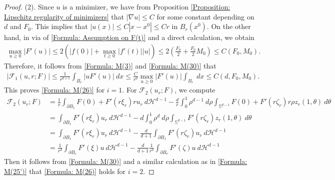 \documentclass[11pt,reqno]{amsart}
\begin{document}
\begin{proof}
    (2). Since $u$ is a minimizer, we have from Proposition \ref{Proposition: Lipschitz regularity of minimizers} that $|\nabla u|\leqslant C$ for some constant depending on $d$ and $F_{0}$. This implies that $|u(x)|\leqslant C|x-x^{0}|\leqslant Cr$ in $B_{r}(x^{0})$. On the other hand, in via of \eqref{Formula: Assumption on F(t)} and a direct calculation, we obtain
    \begin{align}\label{Formula: M(30)}
    	\max_{u\geqslant0}|F'(u)|\leqslant2(|f(0)|+\max_{t\geqslant0}|f'(t)||u|)\leqslant2\left(\frac{F_{0}}{2}+\frac{F_{0}}{2}M_{0}\right)\leqslant C(F_{0},M_{0}).
    \end{align}
    Therefore, it follows from \eqref{Formula: M(3)} and \eqref{Formula: M(30)} that
    \begin{align}\label{Formula: M(25')}
    	|\mathcal{F}_{1}(u,r;F)|\leqslant\frac{1}{r^{d+1}}\int_{B_{r}}|uF'(u)|\:dx\leqslant\frac{C}{r^{d}}\max_{u\geqslant0}|F'(u)|\int_{B_{r}}\:dx\leqslant C(d,F_{0},M_{0}).
    \end{align}
    This proves \eqref{Formula: M(26)} for $i=1$. For $\mathcal{F}_{2}(u_{r};F)$, we compute
    \begin{align*}
    	\mathcal{F}_{2}(u_{r};F)&=\frac{1}{r}\int_{\partial B_{1}}F(0)+F'(r\xi_{r})ru_{r}\:d\mathcal{H}^{d-1}-\frac{d}{r}\int_{0}^{1}\rho^{d-1}\:d\rho\int_{\mathbb{S}^{d-1}}F(0)+F'(r\zeta_{r})r\rho z_{r}(1,\theta)\:d\theta\\
    	&=\int_{\partial B_{1}}F'(r\xi_{r})u_{r}\:d\mathcal{H}^{d-1}-d\int_{0}^{1}\rho^{d}\:d\rho\int_{\mathbb{S}^{d-1}}F'(r\zeta_{r})z_{r}(1,\theta)\:d\theta\\
    	&=\int_{\partial B_{1}}F'(r\xi_{r})u_{r}\:d\mathcal{H}^{d-1}-\frac{d}{d+1}\int_{\partial B_{1}}F'(r\zeta_{r})u_{r}\:d\mathcal{H}^{d-1}\\
    	&=\frac{1}{r^{d}}\int_{\partial B_{r}}F'(\xi)u\:d\mathcal{H}^{d-1}-\frac{d}{d+1}\frac{1}{r^{d}}\int_{\partial B_{r}}F'(\zeta)u\:d\mathcal{H}^{d-1}
    \end{align*}
    Then it follows from \eqref{Formula: M(30)} and a similar calculation as in \eqref{Formula: M(25')} that \eqref{Formula: M(26)} holds for $i=2$.
    

\end{proof}
\end{document}
